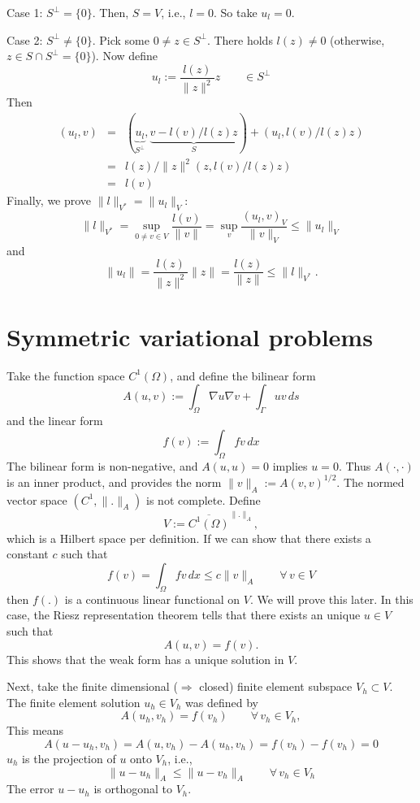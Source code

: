\noindent
Case 1: $S^\bot = \{ 0 \}$. Then, $S = V$, i.e., $l = 0$. So take $u_l = 0$.

\noindent
Case 2: $S^\bot \neq \{ 0 \}$. Pick some $0 \neq z \in S^\bot$. There
holds $l(z) \neq 0$ (otherwise, $z \in S \cap S^\bot = \{ 0 \}$).
Now define 
$$
u_l := \frac{l(z)}{\|z\|^2} z \qquad \in S^\bot
$$
Then
\begin{eqnarray*}
(u_l,v) & = & (\underbrace{u_l}_{S^\bot}, \underbrace{v - l(v)/l(z) z}_S) + (u_l,l(v)/l(z)z) \\
& = & l(z) / \| z\|^2 (z,l(v)/l(z) z) \\
& = & l(v)
\end{eqnarray*}
Finally, we prove $\|l\|_{V^\ast} = \| u_l \|_V$:
$$
\|l\|_{V^\ast} = \sup_{0 \neq v \in V} \frac{l(v)}{\|v\|}
        = \sup_v \frac{(u_l,v)_V}{\|v\|_V} \leq \| u_l \|_V
$$
and
$$
\| u_l \| = \frac{l(z)}{\|z\|^2}  \|z\| = \frac{l(z)}{\|z\|} \leq \| l \|_{V^\ast}.
$$

\section{Symmetric variational problems}
Take the function space $C^1(\Omega)$, and define the bilinear form
$$
A(u,v) := \int_\Omega \nabla u \nabla v + \int_\Gamma u v \, ds
$$
and the linear form
$$
f(v) := \int_\Omega f v \, dx
$$
The bilinear form is non-negative, and $A(u,u) = 0$ implies $u = 0$.
Thus $A(\cdot,\cdot)$ is an inner product, and provides the
norm $\|v\|_A := A(v,v)^{1/2}$. The normed vector space $(C^1, \|.\|_A)$
is not complete. Define
$$
V := \overline{C^1(\Omega)}^{\|.\|_A},
$$
which is a Hilbert space per definition. If we can show that there exists
a constant $c$ such that
$$
f(v) = \int_\Omega f v \, dx \leq c \| v \|_A \qquad \forall \, v \in V
$$
then $f(.)$ is a continuous linear functional on $V$.
We will prove this later. In this case, the Riesz representation theorem 
tells that there exists an unique $u \in V$ such that
$$
A(u,v) = f(v).
$$
This shows that the weak form has a unique solution in $V$.

Next, take the finite dimensional ($\Rightarrow$ closed) finite element subspace $V_h \subset V$.
The finite element solution $u_h \in V_h$ was defined by
$$
A(u_h,v_h) = f(v_h) \qquad \forall \, v_h \in V_h,
$$
This means
$$
A(u-u_h, v_h) = A(u,v_h) - A(u_h,v_h) = f(v_h) - f(v_h) = 0
$$
$u_h$ is the projection of $u$ onto $V_h$, i.e.,
$$
\| u - u_h \|_A \leq \| u - v_h \|_A \qquad \forall \, v_h \in V_h
$$
The error $u - u_h$ is orthogonal to $V_h$.

